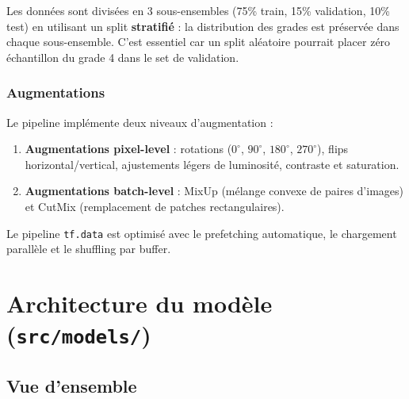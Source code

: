 \documentclass[11pt,a4paper]{article}
\begin{document}
Les données sont divisées en 3 sous-ensembles (75\% train, 15\% validation, 10\% test) en utilisant un split \textbf{stratifié} : la distribution des grades est préservée dans chaque sous-ensemble. C'est essentiel car un split aléatoire pourrait placer zéro échantillon du grade 4 dans le set de validation.

\subsubsection{Augmentations}

Le pipeline implémente deux niveaux d'augmentation :

\begin{enumerate}[leftmargin=2em]
  \item \textbf{Augmentations pixel-level} : rotations ($0^{\circ}$, $90^{\circ}$, $180^{\circ}$, $270^{\circ}$), flips horizontal/vertical, ajustements légers de luminosité, contraste et saturation.
  \item \textbf{Augmentations batch-level} : MixUp (mélange convexe de paires d'images) et CutMix (remplacement de patches rectangulaires).
\end{enumerate}

Le pipeline \texttt{tf.data} est optimisé avec le prefetching automatique, le chargement parallèle et le shuffling par buffer.

\section{Architecture du modèle (\texttt{src/models/})}

\subsection{Vue d'ensemble}

\begin{center}
\end{center}
\end{document}
